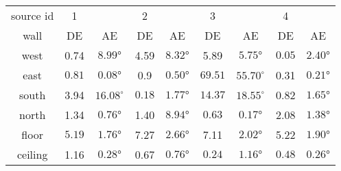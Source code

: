 \begin{tabular*}{\linewidth}{c|cc|cc|cc|cc}
\toprule
source id &	1	& &	2	& &	3	& &	4 &	\\
wall &	DE&	AE&	DE&	AE&	DE&	AE&	DE&	AE\\
\hline
west &	0.74	& $\ang{8.99}$      & 4.59	& $\ang{8.32}$  & 5.89	& $\ang{5.75}$	& $\mathbf{0.05}$    & $\mathbf{\ang{2.40}}$\\
east &	$\mathbf{0.81}$	& $\mathbf{\ang{0.08}}$      & 0.9	& $\ang{0.50}$	&$\mathit{69.51}$	& $\mathit{55.70}^\circ$	& 0.31    & $\ang{0.21}$\\
south&	3.94	&$\mathit{16.08}^\circ$      & $\mathbf{0.18}$	& $\ang{1.77}$	&$\mathit{14.37}$ & $\mathit{18.55}^\circ$	& 0.82    & $\mathbf{\ang{1.65}}$\\
north&	1.34	& $\ang{0.76}$	    & 1.40	& $\ang{8.94}$	& $\mathbf{0.63}$	& $\mathbf{\ang{0.17}}$	& 2.08    & $\ang{1.38}$\\
floor&	$\mathbf{5.19}$	& $\mathbf{\ang{1.76}}$	    & 7.27	& $\ang{2.66}$	& 7.11	& $\ang{2.02}$	& 5.22    & $\ang{1.90}$\\
ceiling&1.16	& $\ang{0.28}$	    & 0.67	& $\ang{0.76}$	& $\mathbf{0.24}$	& $\ang{1.16}$	& $0.48$    & $\mathbf{\ang{0.26}}$\\

\bottomrule
\end{tabular*}
